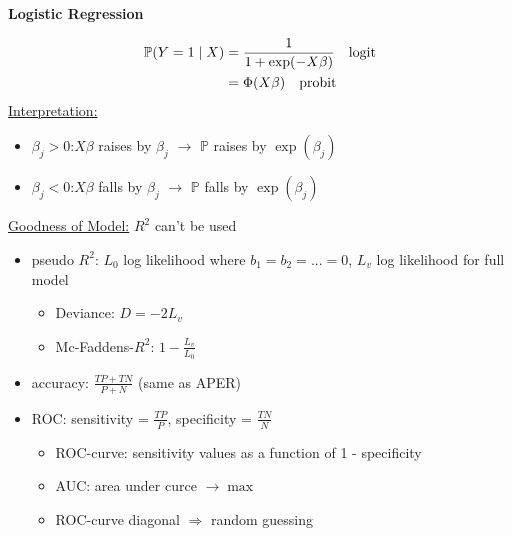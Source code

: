 \documentclass[10pt,landscape,a4paper]{article}
\begin{document}
\begin{multicols*}{4}
\begin{center}
	\normalsize{\textbf{Logistic Regression}} \\
\end{center}
\begin{align}
	\mathbb{P}(Y = 1\mid X) &= \frac{1}{1+\exp(-X\beta)} \quad\text{logit} \notag \\
	&= \Phi(X\beta) \quad\text{probit} \notag
\end{align}
\underline{Interpretation:}
\begin{itemize}
	\item $\beta_j>0$:$X\beta$ raises by $\beta_j$ $\to$ $\mathbb{P}$ raises by $\exp(\beta_j)$
	\item $\beta_j<0$:$X\beta$ falls by $\beta_j$ $\to$ $\mathbb{P}$ falls by $\exp(\beta_j)$
\end{itemize}
\underline{Goodness of Model:} $R^2$ can't be used
\begin{itemize}
	\item pseudo $R^2$: $L_0$ log likelihood where $b_1=b_2=...=0$, $L_v$ log likelihood for full model
	\begin{itemize}
		\item Deviance: $D=-2L_v$
		\item Mc-Faddens-$R^2$: $1-\frac{L_v}{L_0}$
	\end{itemize}
	\item accuracy: $\frac{TP + TN}{P+N}$ (same as APER)
	\item ROC: sensitivity = $\frac{TP}{P}$, specificity = $\frac{TN}{N}$
	\begin{itemize}
		\item ROC-curve: sensitivity values as a function of 1 - specificity
		\item AUC: area under curce $\to\max$
		\item ROC-curve diagonal $\Rightarrow$ random guessing
	\end{itemize}
\end{itemize}

\end{multicols*}
\end{document}
